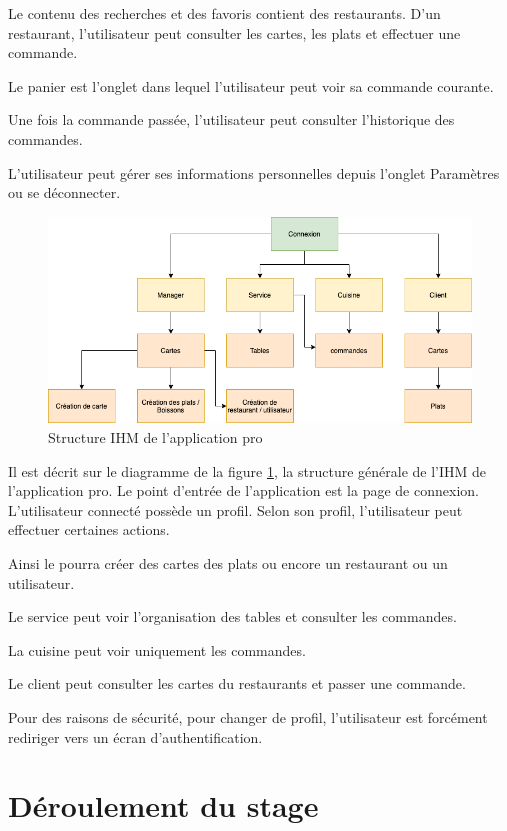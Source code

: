 Le contenu des recherches et des favoris contient des restaurants. D'un restaurant, l'utilisateur peut consulter les cartes, les plats et effectuer une commande.

Le panier est l'onglet dans lequel l'utilisateur peut voir sa commande courante.

Une fois la commande passée, l'utilisateur peut consulter l'historique des commandes.

L'utilisateur peut gérer ses informations personnelles depuis l'onglet Paramètres ou se déconnecter.

\begin{figure}[H]
	\centering
	\includegraphics[scale=0.5]{assets/images/pro_ihm.png}
	\caption{Structure \gls{IHM} de l'application pro}
	\label{fig.17}
\end{figure}
Il est décrit sur le diagramme de la figure \ref{fig.17}, la structure générale de l'\gls{IHM} de l'application pro. Le point d'entrée de l'application est la page de connexion. L'utilisateur connecté possède un profil. Selon son profil, l'utilisateur peut effectuer certaines actions.

Ainsi le \m pourra créer des cartes des plats ou encore un restaurant ou un utilisateur.

Le service peut voir l'organisation des tables et consulter les commandes.

La cuisine peut voir uniquement les commandes.

Le client peut consulter les cartes du restaurants et passer une commande.

Pour des raisons de sécurité, pour changer de profil, l'utilisateur est forcément rediriger vers un écran d'authentification.
\section{Déroulement du stage}
